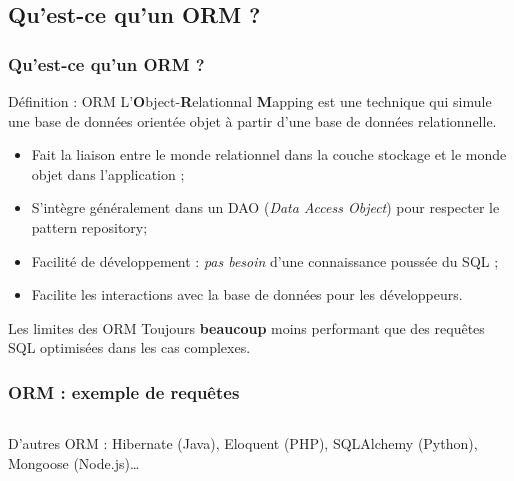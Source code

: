     \subsection{Qu'est-ce qu'un ORM ?}
    \begin{frame}
        \frametitle{Qu'est-ce qu'un ORM ?}

        \begin{block}{Définition : ORM}
            L'\textbf{O}bject-\textbf{R}elationnal \textbf{M}apping est une technique qui simule une base de données orientée objet à partir d'une base de données relationnelle.
        \end{block}

        \begin{itemize}
            \footnotesize
            \item Fait la liaison entre le monde relationnel dans la couche stockage et le monde objet dans l'application ;
            \item S'intègre généralement dans un DAO (\textit{Data Access Object}) pour respecter le pattern repository;
            \item Facilité de développement : \textit{pas besoin} d'une connaissance poussée du SQL ;
            \item Facilite les interactions avec la base de données pour les développeurs.
        \end{itemize}

        \begin{alertblock}{Les limites des ORM}
            Toujours \textbf{beaucoup} moins performant que des requêtes SQL optimisées dans les cas complexes.
        \end{alertblock}
    \end{frame}

    \begin{frame}
        \frametitle{ORM : exemple de requêtes}

        \begin{listing}[H]
            \inputminted[fontsize=\tiny, linenos=true]{java}{code/eloquent.java}
            \caption{Quelques requêtes basiques avec un ORM imaginaire.}
        \end{listing}

        \scriptsize{D'autres ORM : Hibernate (Java), Eloquent (PHP), SQLAlchemy (Python), Mongoose (Node.js)\dots}
    \end{frame}
